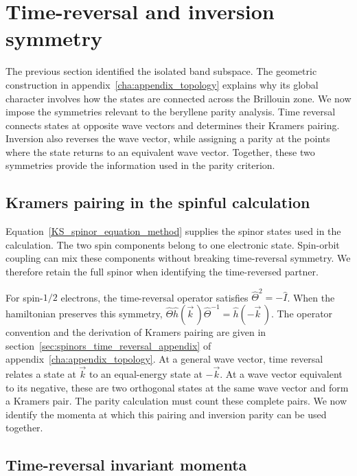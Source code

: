 \newpage
\section{Time-reversal and inversion symmetry}
\label{sec:symmetry_and_kramers_pairs_topology}

The previous section identified the isolated band subspace.
The geometric construction in appendix~\ref{cha:appendix_topology} explains why its global character involves how the states are connected across the Brillouin zone.
We now impose the symmetries relevant to the beryllene parity analysis.
Time reversal connects states at opposite wave vectors and determines their Kramers pairing.
Inversion also reverses the wave vector, while assigning a parity at the points where the state returns to an equivalent wave vector.
Together, these two symmetries provide the information used in the parity criterion.

\subsection{Kramers pairing in the spinful calculation}

Equation~\eqref{KS_spinor_equation_method} supplies the spinor states used in the calculation.
The two spin components belong to one electronic state.
Spin-orbit coupling can mix these components without breaking time-reversal symmetry.
We therefore retain the full spinor when identifying the time-reversed partner.

For spin-$1/2$ electrons, the time-reversal operator satisfies $\hat{\Theta}^2=-\hat{I}$.
When the hamiltonian preserves this symmetry,
$\hat{\Theta}\hat{h}(\vec{k}\,)\hat{\Theta}^{-1}=\hat{h}(-\vec{k}\,)$.
The operator convention and the derivation of Kramers pairing are given in section~\ref{sec:spinors_time_reversal_appendix} of appendix~\ref{cha:appendix_topology}.
At a general wave vector, time reversal relates a state at $\vec{k}$ to an equal-energy state at $-\vec{k}$.
At a wave vector equivalent to its negative, these are two orthogonal states at the same wave vector and form a Kramers pair.
The parity calculation must count these complete pairs.
We now identify the momenta at which this pairing and inversion parity can be used together.

\subsection{Time-reversal invariant momenta}
\label{subsec:trim_topology}

